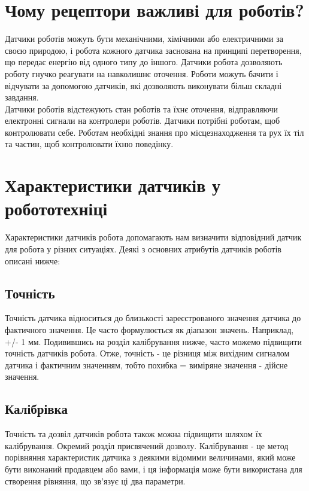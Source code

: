 \documentclass[a4paper,14pt]{extreport}
\begin{document}
\section{Чому рецептори важливі для роботів?}\par

Датчики роботів можуть бути механічними, хімічними або електричними за своєю природою, і робота кожного датчика заснована на принципі перетворення, що передає енергію від одного типу до іншого. Датчики робота дозволяють роботу гнучко реагувати на навколишнє оточення. Роботи можуть бачити і відчувати за допомогою датчиків, які дозволяють виконувати більш складні завдання.\\ 

Датчики роботів відстежують стан роботів та їхнє оточення, відправляючи електронні сигнали на контролери роботів. Датчики потрібні роботам, щоб контролювати себе. Роботам необхідні знання про місцезнаходження та рух їх тіл та частин, щоб контролювати їхню поведінку.

\section{Характеристики датчиків у робототехніці}\par

Характеристики датчиків робота допомагають нам визначити відповідний датчик для робота у різних ситуаціях. Деякі з основних атрибутів датчиків роботів описані нижче:

\subsection{Точність}
Точність датчика відноситься до близькості зареєстрованого значення датчика до фактичного значення. Це часто формулюється як діапазон значень. Наприклад, +/- 1 мм. Подивившись на розділ калібрування нижче, часто можемо підвищити точність датчиків робота. Отже, точність - це різниця між вихідним сигналом датчика і фактичним значенням, тобто похибка = виміряне значення - дійсне значення.

\subsection{Калібрівка}
Точність та дозвіл датчиків робота також можна підвищити шляхом їх калібрування. Окремий розділ присвячений дозволу. Калібрування - це метод порівняння характеристик датчика з деякими відомими величинами, який може бути виконаний продавцем або вами, і ця інформація може бути використана для створення рівняння, що зв'язує ці два параметри.\\
\end{document}

